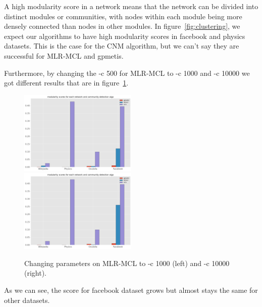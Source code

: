 \documentclass[letterpaper, 11pt]{article}
\newcommand{\1}{\mathds{1}}	%
\theoremstyle{definition}
\begin{document}
A high modularity score in a network means that the network can be divided into distinct modules or communities, with nodes within each module being more densely connected than nodes in other modules. In figure~\ref{fig:clustering}, we expect our algorithms to have high modularity scores in facebook and physics datasets. This is the case for the CNM algorithm, but we can't say they are successful for MLR-MCL and gpmetis.

Furthermore, by changing the -c 500 for MLR-MCL to -c 1000 and -c 10000 we got different results that are in figure~\ref{fig:c}.
\begin{figure}[h]
\includegraphics[width=0.5\textwidth]{output1000.png}
\includegraphics[width=0.5\textwidth]{output10000.png}
\captionsetup{justification=centering,margin=0.5cm}
\caption{Changing parameters on MLR-MCL to -c 1000 (left) and -c 10000 (right).}
\label{fig:c}
\end{figure}

As we can see, the score for facebook dataset grows but almost stays the same for other datasets.



\newpage


\end{document}
